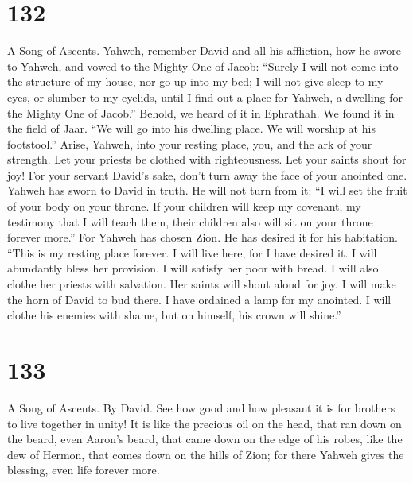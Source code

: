 \hypertarget{section-122}{%
\section{132}\label{section-122}}

A Song of Ascents.  Yahweh, remember David and all his
affliction,  how he swore to Yahweh, and vowed to the Mighty
One of Jacob:  ``Surely I will not come into the structure
of my house, nor go up into my bed;  I will not give sleep
to my eyes, or slumber to my eyelids,  until I find out a
place for Yahweh, a dwelling for the Mighty One of Jacob.'' 
Behold, we heard of it in Ephrathah. We found it in the field of Jaar.
 ``We will go into his dwelling place. We will worship at
his footstool.''  Arise, Yahweh, into your resting place,
you, and the ark of your strength.  Let your priests be
clothed with righteousness. Let your saints shout for joy! 
For your servant David's sake, don't turn away the face of your anointed
one.  Yahweh has sworn to David in truth. He will not turn
from it: ``I will set the fruit of your body on your throne.
 If your children will keep my covenant, my testimony that
I will teach them, their children also will sit on your throne forever
more.''  For Yahweh has chosen Zion. He has desired it for
his habitation.  ``This is my resting place forever. I will
live here, for I have desired it.  I will abundantly bless
her provision. I will satisfy her poor with bread.  I will
also clothe her priests with salvation. Her saints will shout aloud for
joy.  I will make the horn of David to bud there. I have
ordained a lamp for my anointed.  I will clothe his enemies
with shame, but on himself, his crown will shine.''

\hypertarget{section-123}{%
\section{133}\label{section-123}}

A Song of Ascents. By David.  See how good and how pleasant
it is for brothers to live together in unity!  It is like
the precious oil on the head, that ran down on the beard, even Aaron's
beard, that came down on the edge of his robes,  like the
dew of Hermon, that comes down on the hills of Zion; for there Yahweh
gives the blessing, even life forever more.


